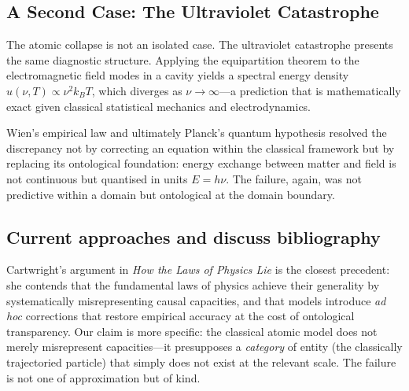 \subsection{A Second Case: The Ultraviolet Catastrophe}

The atomic collapse is not an isolated case. The ultraviolet catastrophe \cite{rayleigh_1900_radiation, jeans_1905_partition} presents the same diagnostic structure. Applying the equipartition theorem to the electromagnetic field modes in a cavity yields a spectral energy density $u(\nu,T) \propto \nu^2 k_BT$, which diverges as $\nu \to\infty$---a prediction that is mathematically exact given classical statistical mechanics and electrodynamics. 

\medskip

Wien's empirical law \cite{wien_1896_radiation} and ultimately Planck's quantum hypothesis \cite{planck_1900_radiation} resolved the discrepancy not by correcting an equation within the classical framework but by replacing its ontological foundation: energy exchange between matter and field is not continuous but quantised in units $E = h\nu$. The failure, again, was not predictive within a domain but ontological at the domain boundary.

\medskip


\subsection{Current approaches and discuss bibliography}

\medskip

Cartwright's argument in \textit{How the Laws of Physics Lie} \cite{cartwright_1983_laws} is the closest precedent: she contends that the fundamental laws of physics achieve their generality by systematically misrepresenting causal capacities, and that models introduce \textit{ad hoc} corrections that restore empirical accuracy at the cost of ontological transparency. Our claim is more specific: the classical atomic model does not merely misrepresent capacities---it presupposes a \textit{category} of entity (the classically trajectoried particle) that simply does not exist at the relevant scale. The failure is not one of approximation but of kind.

